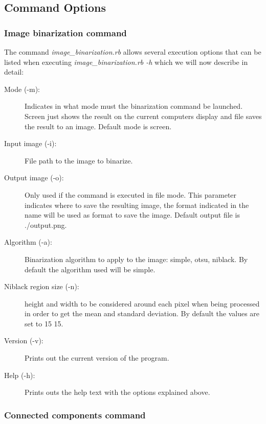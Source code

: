 \documentclass[a4paper,10pt,titlepage]{article}
\begin{document}
\subsection{Command Options}

\subsubsection{Image binarization command}

\par The command \textit{image\_binarization.rb} allows several execution options that can be listed when executing  \textit{image\_binarization.rb -h} which we will now describe in detail:
\begin{description}
	\item[Mode (-m):] Indicates in what mode must the binarization command be launched. Screen just shows the result on the current computers display and file saves the result to an image. Default mode is screen.
	\item[Input image (-i):] File path to the image to binarize.
	\item[Output image (-o):] Only used if the command is executed in file mode. This parameter indicates where to save the resulting image, the format indicated in the name will be used as format to save the image. Default output file is ./output.png.
	\item[Algorithm (-a):] Binarization algorithm to apply to the image: simple, otsu, niblack. By default the algorithm used will be simple. 
	\item[Niblack region size (-n):] height and width to be considered around each pixel when being processed in order to get the mean and standard deviation. By default the values are set to 15 15.
	\item[Version (-v):] Prints out the current version of the program.
	\item[Help (-h):] Prints outs the help text with the options explained above.

\end{description}

\subsubsection{Connected components command}
\end{document}
